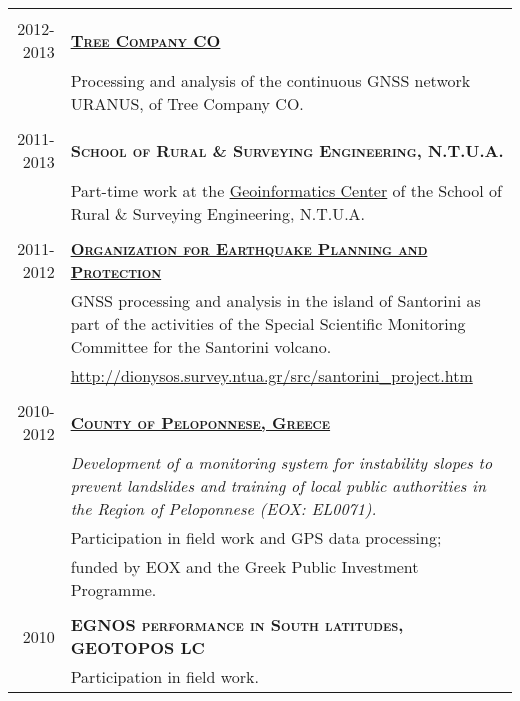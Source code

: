 \documentclass[9pt]{extarticle} %
\begin{document}
\begin{longtable}{r|p{13cm}}
%
\multicolumn{2}{c}{} \\
\textsc{2012-2013} & \textbf{\textsc{\href{http://www.treecomp.gr/}{Tree Company CO}}}\\
  & Processing and analysis of the continuous GNSS network URANUS, of Tree Company CO.\\
%
\multicolumn{2}{c}{} \\
\textsc{2011-2013} & \textbf{\textsc{School of Rural \& Surveying Engineering, N.T.U.A.}}\\
  & Part-time work at the \href{http://portal.survey.ntua.gr/main/geocenter/geocen-g.html}{Geoinformatics Center} of the School of Rural \& Surveying Engineering, N.T.U.A.\\
%
\multicolumn{2}{c}{} \\
\textsc{2011-2012} & \textbf{\textsc{\href{http://www.oasp.gr/}{Organization for Earthquake Planning and Protection}}}\\
  & GNSS processing and analysis in the island of Santorini as part of the activities of the Special Scientific Monitoring Committee for the Santorini volcano.\\
  & \url{http://dionysos.survey.ntua.gr/src/santorini_project.htm}\\
%
\multicolumn{2}{c}{}\\
\textsc{2010-2012} & \textbf{\textsc{\href{http://www.landslides.gr/index.php?lang=en}{County of Peloponnese, Greece}}}\\
  & \textit{Development of a monitoring system for instability slopes to prevent landslides and training of local public authorities in the Region of Peloponnese (EOX: EL0071).}\\
  & Participation in field work and GPS data processing;\\
  & funded by EOX and the Greek Public Investment Programme.\\
%
\multicolumn{2}{c}{}\\
\textsc{2010} & \textbf{\textsc{EGNOS performance in South latitudes, GEOTOPOS LC}}\\
  & Participation in field work.\\
%
\end{longtable}
\medskip

\end{document}
